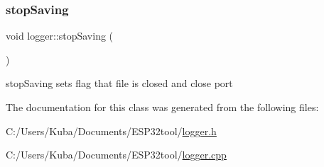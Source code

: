 \subsubsection{\texorpdfstring{stop\+Saving}{stopSaving}}
{\footnotesize\ttfamily void logger\+::stop\+Saving (\begin{DoxyParamCaption}{ }\end{DoxyParamCaption})\hspace{0.3cm}{\ttfamily [slot]}}



stop\+Saving sets flag that file is closed and close port 



The documentation for this class was generated from the following files\+:\begin{DoxyCompactItemize}
\item 
C\+:/\+Users/\+Kuba/\+Documents/\+E\+S\+P32tool/\hyperlink{logger_8h}{logger.\+h}\item 
C\+:/\+Users/\+Kuba/\+Documents/\+E\+S\+P32tool/\hyperlink{logger_8cpp}{logger.\+cpp}\end{DoxyCompactItemize}
